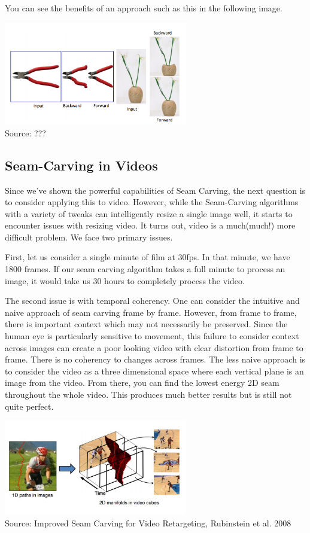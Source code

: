 \documentclass{article}
\begin{document}
You can see the benefits of an approach such as this in the following image. 

\begin{center}
\includegraphics[width=8cm]{forward_energy.PNG} \\
Source: ???
\end{center}

\subsection{Seam-Carving in Videos}
Since we've shown the powerful capabilities of Seam Carving, the next question is to consider applying this to video. However, while the Seam-Carving algorithms with a variety of tweaks can intelligently resize a single image well, it starts to encounter issues with resizing video. It turns out, video is a much(much!) more difficult problem. We face two primary issues. 

First, let us consider a single minute of film at 30fps. In that minute, we have 1800 frames. If our seam carving algorithm takes a full minute to process an image, it would take us 30 hours to completely process the video. 

The second issue is with temporal coherency. One can consider the intuitive and naive approach of seam carving frame by frame. However, from frame to frame, there is important context which may not necessarily be preserved. Since the human eye is particularly sensitive to movement, this failure to consider context across images can create a poor looking video with clear distortion from frame to frame. There is no coherency to changes across frames. The less naive approach is to consider the video as a three dimensional space where each vertical plane is an image from the video. From there, you can find the lowest energy 2D seam throughout the whole video. This produces much better results but is still not quite perfect. 
\begin{center}
\includegraphics[width=8cm]{video_retargeting.JPG} \\
Source: Improved Seam Carving for Video Retargeting, Rubinstein et al. 2008
\end{center}
\end{document}
